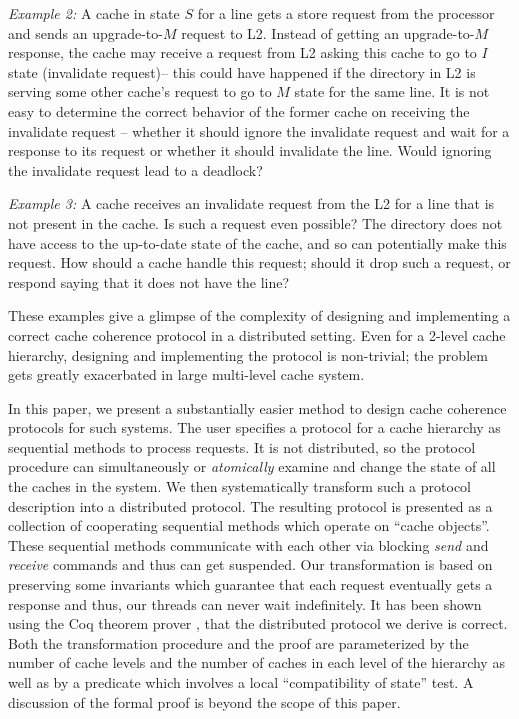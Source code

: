 \noindent \emph{Example 2:} A cache in state $S$ for a line gets a store
request from the processor and sends an upgrade-to-$M$ request to L2. Instead
of getting an upgrade-to-$M$ response, the cache may receive a request from L2
asking this cache to go to $I$ state (invalidate request)-- this could have
happened if the directory in L2 is serving some other cache's request to go to
$M$ state for the same line. It is not easy to determine the correct behavior
of the former cache on receiving the invalidate request -- whether it should
ignore the invalidate request and wait for a response to its request or whether
it should invalidate the line. Would ignoring the invalidate request lead to a
deadlock?

\noindent \emph{Example 3:} A cache receives an invalidate request from the
L2 for a line that is not present in the cache. Is such a request even
possible? The directory does not have access to the up-to-date state of the
cache, and so can potentially make this request. How should a cache handle this
request; should it drop such a request, or respond saying that it does not have
the line?

These examples give a glimpse of the complexity of designing and implementing a
correct cache coherence protocol in a distributed setting.  Even for a 2-level
cache hierarchy, designing and implementing the protocol is non-trivial; the
problem gets greatly exacerbated in large multi-level cache system. 

In this paper, we present a substantially easier method to design cache
coherence protocols for such systems. The user specifies a protocol for a cache
hierarchy as sequential methods to process requests. It is not distributed, so the protocol procedure can simultaneously or \emph{atomically}
examine and change the state of all the caches in the system. We then
systematically transform such a protocol description into a distributed protocol. The resulting protocol is presented as a collection
of cooperating sequential methods which operate on ``cache objects''.  These
sequential methods communicate with each other via blocking \emph{send} and
\emph{receive} commands and thus can get suspended. Our transformation is based
on preserving some invariants which guarantee that each request eventually gets
a response and thus, our threads can never wait indefinitely.  It has been
shown using the Coq theorem prover \cite{}, that the distributed protocol we
derive is correct.  Both the transformation procedure and the proof are
parameterized by the number of cache levels and the number of caches in each
level of the hierarchy as well as by a predicate which involves a local
``compatibility of state'' test. A discussion of the formal proof is beyond the
scope of this paper. 

